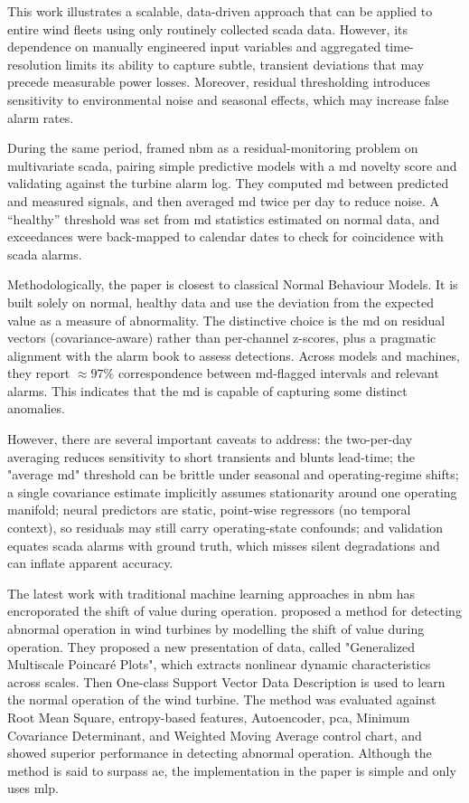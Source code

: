 This work illustrates a scalable, data-driven approach that can be applied to entire wind fleets using only routinely collected \gls{scada} data.
However, its dependence on manually engineered input variables and aggregated time-resolution limits its ability to capture subtle, transient deviations that may precede measurable power losses.
Moreover, residual thresholding introduces sensitivity to environmental noise and seasonal effects, which may increase false alarm rates.

During the same period, \cite{liu_wind_2022} framed \gls{nbm} as a residual-monitoring problem on multivariate \gls{scada}, pairing simple predictive models with a \gls{md} novelty score and validating against the turbine alarm log.
They computed \gls{md} between predicted and measured signals, and then averaged \gls{md} twice per day to reduce noise.
A “healthy” threshold was set from \gls{md} statistics estimated on normal data, and exceedances were back-mapped to calendar dates to check for coincidence with \gls{scada} alarms.

Methodologically, the paper is closest to classical Normal Behaviour Models.
It is built solely on normal, healthy data and use the deviation from the expected value as a measure of abnormality.
The distinctive choice is the \gls{md} on residual vectors (covariance-aware) rather than per-channel z-scores, plus a pragmatic alignment with the alarm book to assess detections.
Across models and machines, they report $\approx 97\%$ correspondence between \gls{md}-flagged intervals and relevant alarms.
This indicates that the \gls{md} is capable of capturing some distinct anomalies.

However, there are several important caveats to address: the two-per-day averaging reduces sensitivity to short transients and blunts lead-time; the "average \gls{md}" threshold can be brittle under seasonal and operating-regime shifts; a single covariance estimate implicitly assumes stationarity around one operating manifold; neural predictors are static, point-wise regressors (no temporal context), so residuals may still carry operating-state confounds; and validation equates \gls{scada} alarms with ground truth, which misses silent degradations and can inflate apparent accuracy.


The latest work with traditional machine learning approaches in \gls{nbm} has encroporated the shift of value during operation.
\cite{shao_detecting_2023} proposed a method for detecting abnormal operation in wind turbines by modelling the shift of value during operation.
They proposed a new presentation of data, called "Generalized Multiscale Poincaré Plots", which extracts nonlinear dynamic characteristics across scales.
Then One-class Support Vector Data Description is used to learn the normal operation of the wind turbine.
The method was evaluated against Root Mean Square, entropy-based features, Autoencoder, \gls{pca}, Minimum Covariance Determinant, and Weighted Moving Average control chart, and showed superior performance in detecting abnormal operation.
Although the method is said to surpass \gls{ae}, the implementation in the paper is simple and only uses \gls{mlp}.


